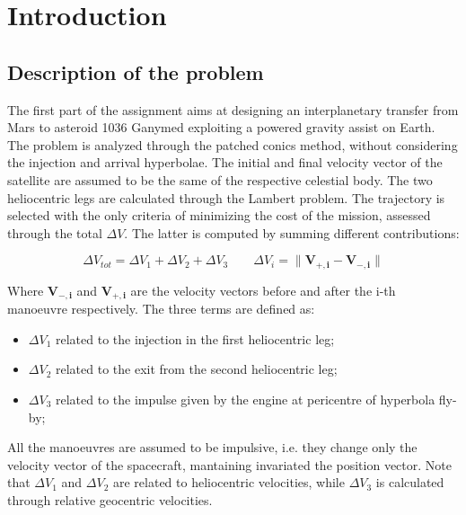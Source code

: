\section{Introduction}
\label{sec:introduction}

\subsection{Description of the problem}
\label{subsec:description}

The first part of the assignment aims at designing an interplanetary transfer from Mars to asteroid 1036 Ganymed exploiting a powered gravity assist on Earth. The problem is analyzed through the patched conics method, without considering the injection and arrival hyperbolae. The initial and final velocity vector of the satellite are assumed to be the same of the respective celestial body. The two heliocentric legs are calculated through the Lambert problem. The trajectory is selected with the only criteria of minimizing the cost of the mission, assessed through the total $\Delta V$. The latter is computed by summing different contributions:


\begin{equation}
        \Delta V_{tot}= \Delta V_1 + \Delta V_2 + \Delta V_3
    \qquad
        \Delta V_i= \lVert \boldsymbol{V_{+,i}} - \boldsymbol{V_{-,i}} \rVert
\end{equation}


Where $\boldsymbol{V_{-,i}}$ and $\boldsymbol{V_{+,i}}$ are the velocity vectors before and after the i-th manoeuvre respectively.
The three terms are defined as:

\begin{itemize}
    [wide,itemsep=3pt,topsep=3pt]
    \item $\Delta V_1$ related to the injection in the first heliocentric leg;
    \item $\Delta V_2$ related to the exit from the second heliocentric leg;
    \item $\Delta V_3$ related to the impulse given by the engine at pericentre of hyperbola fly-by;
\end{itemize}

All the manoeuvres are assumed to be impulsive, i.e. they change only the velocity vector of the spacecraft, mantaining invariated the position vector. Note that $\Delta V_{1}$ and $\Delta V_{2}$ are related to heliocentric velocities, while $\Delta V_{3}$ is calculated through relative geocentric velocities. 


